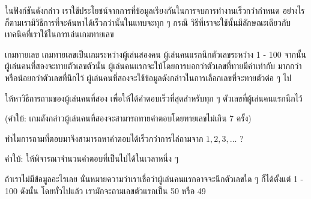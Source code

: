 ใน{\wbr}ฟังก์ชัน{\wbr}ดังกล่าว เรา{\wbr}ใช้ประโยชน์{\wbr}จาก{\wbr}การ{\wbr}ที่{\wbr}ข้อมูล{\wbr}เรียง{\wbr}กัน{\wbr}ใน{\wbr}การ{\wbr}จบ{\wbr}การ{\wbr}ทำงาน{\wbr}เร็ว{\wbr}กว่า{\wbr}กำหนด{\wbr}
อย่างไรก็ตาม{\wbr}เรา{\wbr}มี{\wbr}วิธีการ{\wbr}ที่{\wbr}จะ{\wbr}ค้นหา{\wbr}ได้{\wbr}เร็ว{\wbr}กว่า{\wbr}นั้น{\wbr}ใน{\wbr}แทบ{\wbr}จะ{\wbr}ทุก ๆ กรณี{\wbr}
วิธี{\wbr}ที่{\wbr}เรา{\wbr}จะ{\wbr}ใช้{\wbr}นั้น{\wbr}มี{\wbr}ลักษณะ{\wbr}เดียวกับ{\wbr}เทคนิค{\wbr}ที่{\wbr}เรา{\wbr}ใช้{\wbr}ใน{\wbr}การ{\wbr}เล่น{\wbr}เกม{\wbr}ทาย{\wbr}เลข{\wbr}

\begin{quiz}{เกม{\wbr}ทาย{\wbr}เลข}
เกม{\wbr}ทาย{\wbr}เลข{\wbr}เป็น{\wbr}เกม{\wbr}ระหว่าง{\wbr}ผู้{\wbr}เล่น{\wbr}สอง{\wbr}คน ผู้{\wbr}เล่น{\wbr}คน{\wbr}แรก{\wbr}นึก{\wbr}ตัวเลข{\wbr}ระหว่าง 1 - 100
จากนั้น{\wbr}ผู้{\wbr}เล่น{\wbr}คน{\wbr}ที่{\wbr}สอง{\wbr}จะ{\wbr}ทาย{\wbr}ตัวเลข{\wbr}ตัว{\wbr}นั้น{\wbr}
ผู้{\wbr}เล่น{\wbr}คน{\wbr}แรก{\wbr}จะ{\wbr}ใบ้{\wbr}โดย{\wbr}การ{\wbr}บอก{\wbr}ว่า{\wbr}ตัวเลข{\wbr}ที่{\wbr}ทาย{\wbr}มี{\wbr}ค่า{\wbr}เท่า{\wbr}กับ มาก{\wbr}กว่า หรือ{\wbr}น้อย{\wbr}กว่า{\wbr}ตัวเลข{\wbr}ที่{\wbr}นึก{\wbr}ไว้{\wbr}
ผู้{\wbr}เล่น{\wbr}คน{\wbr}ที่{\wbr}สอง{\wbr}จะ{\wbr}ใช้{\wbr}ข้อมูล{\wbr}ดังกล่าว{\wbr}ใน{\wbr}การ{\wbr}เลือก{\wbr}เลขที่{\wbr}จะ{\wbr}ทาย{\wbr}ตัว{\wbr}ต่อ ๆ ไป{\wbr}

ให้{\wbr}หา{\wbr}วิธีการ{\wbr}ถาม{\wbr}ของ{\wbr}ผู้{\wbr}เล่น{\wbr}คน{\wbr}ที่{\wbr}สอง เพื่อให้{\wbr}ได้{\wbr}คำตอบ{\wbr}เร็ว{\wbr}ที่สุด{\wbr}สำหรับ{\wbr}ทุก ๆ
ตัวเลข{\wbr}ที่{\wbr}ผู้{\wbr}เล่น{\wbr}คน{\wbr}แรก{\wbr}นึก{\wbr}ไว้{\wbr}

(คำ{\wbr}ใบ้: เกม{\wbr}ดังกล่าว{\wbr}ผู้{\wbr}เล่น{\wbr}คน{\wbr}ที่{\wbr}สอง{\wbr}จะ{\wbr}สามารถ{\wbr}ทาย{\wbr}คำตอบ{\wbr}โดย{\wbr}ทาย{\wbr}เลข{\wbr}ไม่{\wbr}เกิน 7 ครั้ง)
\end{quiz}

\begin{quiz}{}
ทำไม{\wbr}การ{\wbr}ถาม{\wbr}ที่{\wbr}ตอบ{\wbr}มา{\wbr}จึง{\wbr}สามารถ{\wbr}หา{\wbr}คำตอบ{\wbr}ได้{\wbr}เร็ว{\wbr}กว่า{\wbr}การ{\wbr}ไล่{\wbr}ถาม{\wbr}จาก $1,2,3,\ldots$ ? 

คำ{\wbr}ใบ้: ให้{\wbr}พิจารณา{\wbr}จำนวน{\wbr}คำตอบ{\wbr}ที่{\wbr}เป็น{\wbr}ไป{\wbr}ได้{\wbr}ใน{\wbr}เวลา{\wbr}หนึ่ง ๆ
\end{quiz}

ถ้า{\wbr}เรา{\wbr}ไม่{\wbr}มี{\wbr}ข้อมูล{\wbr}อะไร{\wbr}เลย นั่น{\wbr}หมายความ{\wbr}ว่า{\wbr}เรา{\wbr}เชื่อ{\wbr}ว่า{\wbr}ผู้{\wbr}เล่น{\wbr}คน{\wbr}แรก{\wbr}อาจ{\wbr}จะ{\wbr}นึก{\wbr}ตัวเลข{\wbr}ใด ๆ
ก็ได้{\wbr}ตั้งแต่ 1 - 100 ดังนั้น โดย{\wbr}ทั่วไป{\wbr}แล้ว เรา{\wbr}มักจะ{\wbr}ถาม{\wbr}เลข{\wbr}ตัว{\wbr}แรก{\wbr}เป็น 50 หรือ 49

